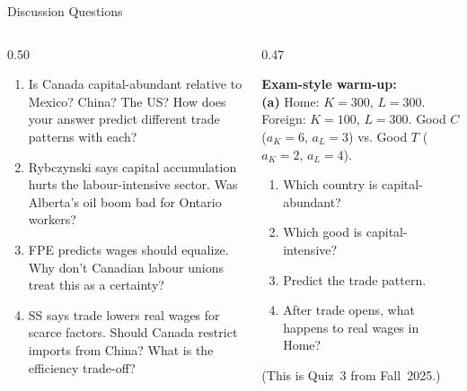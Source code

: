 \documentclass[aspectratio=169]{beamer}
\begin{document}
\begin{frame}[shrink=15]{Discussion Questions}
\begin{columns}[T]
\begin{column}{0.50\textwidth}
\begin{discuss}
\footnotesize
\begin{enumerate}
  \item Is Canada capital-abundant relative to Mexico?
        China? The US? How does your answer predict
        different trade patterns with each?
  \item Rybczynski says capital accumulation hurts
        the labour-intensive sector. Was Alberta's
        oil boom bad for Ontario workers?
  \item FPE predicts wages should equalize. Why don't
        Canadian labour unions treat this as a
        certainty?
  \item SS says trade lowers real wages for scarce
        factors. Should Canada restrict imports from
        China? What is the efficiency trade-off?
\end{enumerate}
\end{discuss}
\end{column}
\begin{column}{0.47\textwidth}
\begin{varbox}
\small\textbf{Exam-style warm-up:}\\[0.3em]
\textbf{(a)} Home: $K=300$, $L=300$.
Foreign: $K=100$, $L=300$.
Good $C$ ($a_K=6$, $a_L=3$) vs.
Good $T$ ($a_K=2$, $a_L=4$).\\[0.2em]
\begin{enumerate}
  \item Which country is capital-abundant?
  \item Which good is capital-intensive?
  \item Predict the trade pattern.
  \item After trade opens, what happens to real wages
        in Home?
\end{enumerate}
(This is Quiz~3 from Fall~2025.)
\end{varbox}
\end{column}
\end{columns}
\end{frame}
\end{document}

